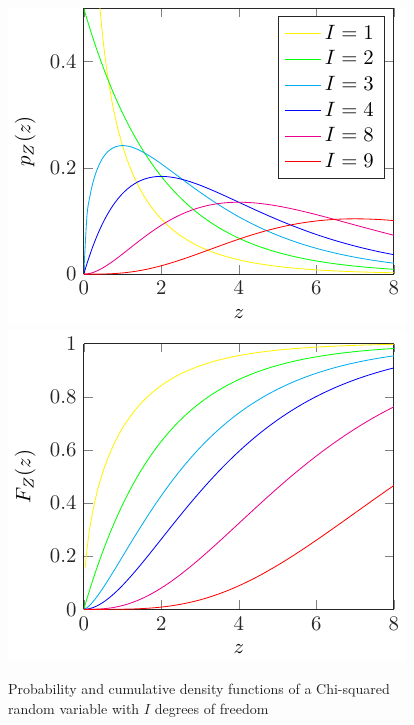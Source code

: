 \begin{figure}[t]
	\begin{center}
		\includegraphics{Figures/Chi2_pdf} \includegraphics{Figures/Chi2_cdf}
	\end{center}
	\caption{Probability and cumulative density functions of a Chi-squared random variable with $I$ degrees of freedom}
	\label{fig:pdf_chi2}
\end{figure}

